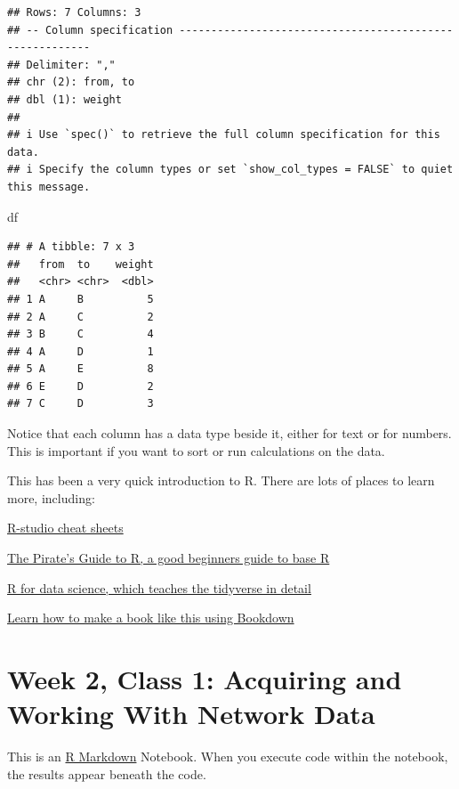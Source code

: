 \documentclass[
]{book}
\newenvironment{Shaded}{\begin{snugshade}}{\end{snugshade}}
\newcommand{\NormalTok}[1]{#1}
\begin{document}
\begin{verbatim}
## Rows: 7 Columns: 3
## -- Column specification --------------------------------------------------------
## Delimiter: ","
## chr (2): from, to
## dbl (1): weight
## 
## i Use `spec()` to retrieve the full column specification for this data.
## i Specify the column types or set `show_col_types = FALSE` to quiet this message.
\end{verbatim}

\begin{Shaded}
\begin{Highlighting}[]
\NormalTok{df}
\end{Highlighting}
\end{Shaded}

\begin{verbatim}
## # A tibble: 7 x 3
##   from  to    weight
##   <chr> <chr>  <dbl>
## 1 A     B          5
## 2 A     C          2
## 3 B     C          4
## 4 A     D          1
## 5 A     E          8
## 6 E     D          2
## 7 C     D          3
\end{verbatim}

Notice that each column has a data type beside it, either for text or for numbers. This is important if you want to sort or run calculations on the data.

This has been a very quick introduction to R. There are lots of places to learn more, including:

\href{https://www.rstudio.com/resources/cheatsheets/}{R-studio cheat sheets}

\href{https://bookdown.org/ndphillips/YaRrr/}{The Pirate's Guide to R, a good beginners guide to base R}

\href{https://r4ds.had.co.nz}{R for data science, which teaches the tidyverse in detail}

\href{https://bookdown.org/yihui/bookdown/introduction.html}{Learn how to make a book like this using Bookdown}

\hypertarget{week-2-class-1-acquiring-and-working-with-network-data}{%
\chapter{Week 2, Class 1: Acquiring and Working With Network Data}\label{week-2-class-1-acquiring-and-working-with-network-data}}

This is an \href{http://rmarkdown.rstudio.com}{R Markdown} Notebook. When you execute code within the notebook, the results appear beneath the code.
\end{document}
